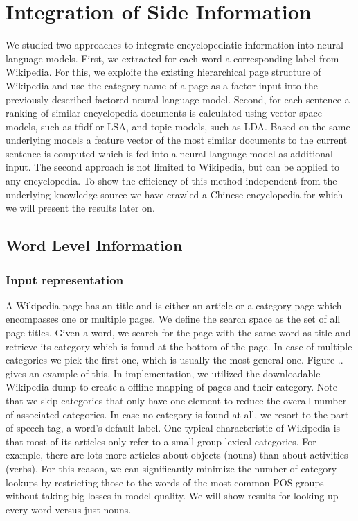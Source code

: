 \documentclass[a4paper]{article}
\begin{document}
\section{Integration of Side Information}
We studied two approaches to integrate encyclopediatic information into neural language models.
First, we extracted for each word a corresponding label from Wikipedia. For this, we exploite the existing hierarchical page structure of Wikipedia and use the category name of a page as a factor input into the previously described factored neural language model.
Second, for each sentence a ranking of similar encyclopedia documents is calculated using vector space models, such as tfidf or LSA, and topic models, such as LDA. Based on the same underlying models a feature vector of the most similar documents to the current sentence is computed which is fed into a neural language model as additional input. The second approach is not limited to Wikipedia, but can be applied to any encyclopedia. To show the efficiency of this method independent from the underlying knowledge source we have crawled a Chinese encyclopedia for which we will present the results later on. 

\subsection{Word Level Information} \label{sec:word-level}
\subsubsection{Input representation}
A Wikipedia page has an title and is either an article or a category page which encompasses one or multiple pages.
We define the search space as the set of all page titles. Given a word, we search for the page with the same word as title and retrieve its category which is found at the bottom of the page.
In case of multiple categories we pick the first one, which is usually the most general one.
Figure .. gives an example of this.
In implementation, we utilized the downloadable Wikipedia dump to create a offline mapping of pages and their category. Note that we skip categories that only have one element to reduce the overall number of associated categories. In case no category is found at all, we resort to the part-of-speech tag, a word's default label.
One typical characteristic of Wikipedia is that most of its articles only refer to a small group lexical categories. For example, there are lots more articles about objects (nouns) than about activities (verbs).
For this reason, we can significantly minimize the number of category lookups by restricting those to the words of the most common POS groups without taking big losses in model quality. We will show results for looking up every word versus just nouns. \\
\\
\end{document}
